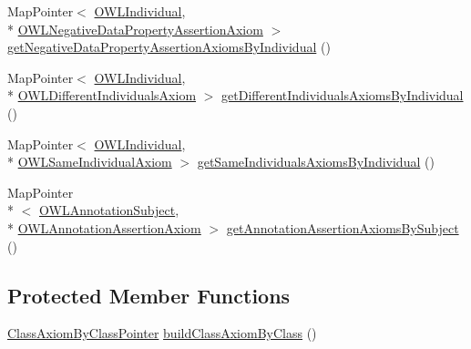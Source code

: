 \begin{DoxyCompactItemize}
\item 
Map\-Pointer$<$ \hyperlink{interfaceorg_1_1semanticweb_1_1owlapi_1_1model_1_1_o_w_l_individual}{O\-W\-L\-Individual}, \\*
\hyperlink{interfaceorg_1_1semanticweb_1_1owlapi_1_1model_1_1_o_w_l_negative_data_property_assertion_axiom}{O\-W\-L\-Negative\-Data\-Property\-Assertion\-Axiom} $>$ \hyperlink{classuk_1_1ac_1_1manchester_1_1cs_1_1owl_1_1owlapi_1_1_abstract_internals_impl_a9825be856aca38bd44ddf6029255744f}{get\-Negative\-Data\-Property\-Assertion\-Axioms\-By\-Individual} ()
\item 
Map\-Pointer$<$ \hyperlink{interfaceorg_1_1semanticweb_1_1owlapi_1_1model_1_1_o_w_l_individual}{O\-W\-L\-Individual}, \\*
\hyperlink{interfaceorg_1_1semanticweb_1_1owlapi_1_1model_1_1_o_w_l_different_individuals_axiom}{O\-W\-L\-Different\-Individuals\-Axiom} $>$ \hyperlink{classuk_1_1ac_1_1manchester_1_1cs_1_1owl_1_1owlapi_1_1_abstract_internals_impl_a3aad6b9e48cbe4817d09a091e51641eb}{get\-Different\-Individuals\-Axioms\-By\-Individual} ()
\item 
Map\-Pointer$<$ \hyperlink{interfaceorg_1_1semanticweb_1_1owlapi_1_1model_1_1_o_w_l_individual}{O\-W\-L\-Individual}, \\*
\hyperlink{interfaceorg_1_1semanticweb_1_1owlapi_1_1model_1_1_o_w_l_same_individual_axiom}{O\-W\-L\-Same\-Individual\-Axiom} $>$ \hyperlink{classuk_1_1ac_1_1manchester_1_1cs_1_1owl_1_1owlapi_1_1_abstract_internals_impl_a25b3358fcc994ebcea073848213c4c0f}{get\-Same\-Individuals\-Axioms\-By\-Individual} ()
\item 
Map\-Pointer\\*
$<$ \hyperlink{interfaceorg_1_1semanticweb_1_1owlapi_1_1model_1_1_o_w_l_annotation_subject}{O\-W\-L\-Annotation\-Subject}, \\*
\hyperlink{interfaceorg_1_1semanticweb_1_1owlapi_1_1model_1_1_o_w_l_annotation_assertion_axiom}{O\-W\-L\-Annotation\-Assertion\-Axiom} $>$ \hyperlink{classuk_1_1ac_1_1manchester_1_1cs_1_1owl_1_1owlapi_1_1_abstract_internals_impl_a95e00330fb7792751f9f411e4a4d7512}{get\-Annotation\-Assertion\-Axioms\-By\-Subject} ()
\end{DoxyCompactItemize}
\subsection*{Protected Member Functions}
\begin{DoxyCompactItemize}
\item 
\hyperlink{classuk_1_1ac_1_1manchester_1_1cs_1_1owl_1_1owlapi_1_1_class_axiom_by_class_pointer}{Class\-Axiom\-By\-Class\-Pointer} \hyperlink{classuk_1_1ac_1_1manchester_1_1cs_1_1owl_1_1owlapi_1_1_abstract_internals_impl_a432bc10c49231eb4e30deec06401e08b}{build\-Class\-Axiom\-By\-Class} ()
\end{DoxyCompactItemize}
